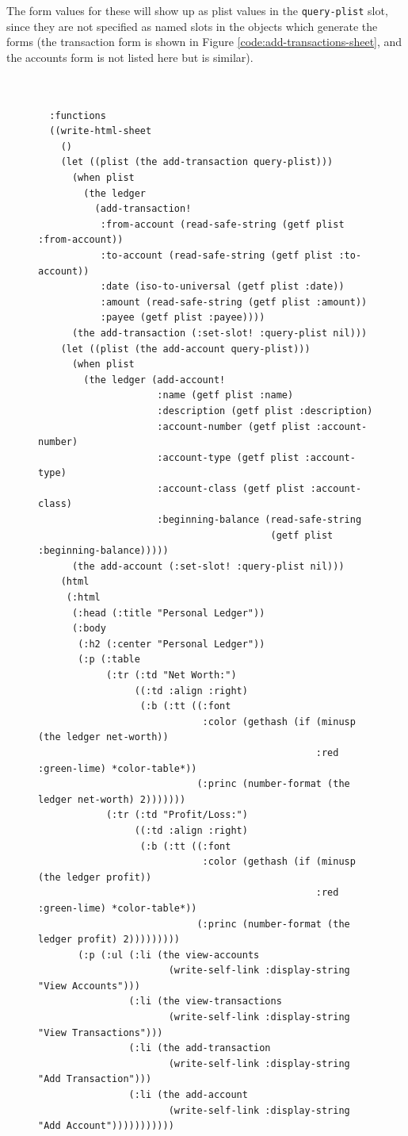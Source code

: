 \documentclass [11pt]{book}
\begin{document}
The form values for these will show up as plist values in the \texttt{query-plist} slot, since they are not specified as named slots in the 
objects which generate the forms (the transaction form is shown 
in Figure 
\ref{code:add-transactions-sheet}, and the accounts form is not listed here but is similar).
\begin{figure}
\begin{lrbox}{\boxedverb}
\begin{minipage}{\linewidth}
\small{

\begin{verbatim}


  :functions
  ((write-html-sheet
    ()
    (let ((plist (the add-transaction query-plist)))
      (when plist
        (the ledger 
          (add-transaction! 
           :from-account (read-safe-string (getf plist :from-account))
           :to-account (read-safe-string (getf plist :to-account))
           :date (iso-to-universal (getf plist :date))
           :amount (read-safe-string (getf plist :amount))
           :payee (getf plist :payee))))
      (the add-transaction (:set-slot! :query-plist nil)))
    (let ((plist (the add-account query-plist)))
      (when plist
        (the ledger (add-account! 
                     :name (getf plist :name)
                     :description (getf plist :description)
                     :account-number (getf plist :account-number)
                     :account-type (getf plist :account-type)
                     :account-class (getf plist :account-class)
                     :beginning-balance (read-safe-string 
                                         (getf plist :beginning-balance)))))
      (the add-account (:set-slot! :query-plist nil)))
    (html 
     (:html 
      (:head (:title "Personal Ledger"))
      (:body 
       (:h2 (:center "Personal Ledger"))
       (:p (:table 
            (:tr (:td "Net Worth:")
                 ((:td :align :right) 
                  (:b (:tt ((:font 
                             :color (gethash (if (minusp (the ledger net-worth)) 
                                                 :red :green-lime) *color-table*))
                            (:princ (number-format (the ledger net-worth) 2)))))))
            (:tr (:td "Profit/Loss:")
                 ((:td :align :right)
                  (:b (:tt ((:font 
                             :color (gethash (if (minusp (the ledger profit)) 
                                                 :red :green-lime) *color-table*))
                            (:princ (number-format (the ledger profit) 2)))))))))
       (:p (:ul (:li (the view-accounts 
                       (write-self-link :display-string "View Accounts")))
                (:li (the view-transactions 
                       (write-self-link :display-string "View Transactions")))
                (:li (the add-transaction 
                       (write-self-link :display-string "Add Transaction")))
                (:li (the add-account 
                       (write-self-link :display-string "Add Account")))))))))))


\end{verbatim}}
\end{minipage}
\end{lrbox}
\end{figure}
\end{document}
